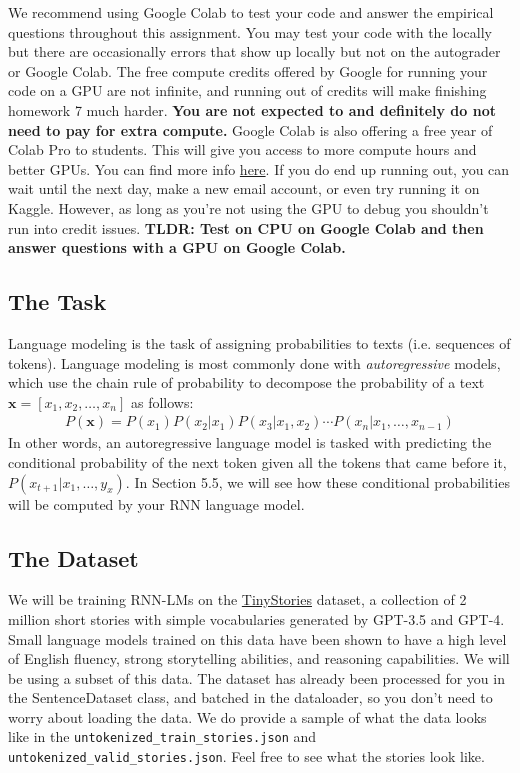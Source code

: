 \documentclass[11pt,addpoints,answers]{exam}
\newcommand{\xv}{\mathbf{x}}
\begin{document}
We recommend using Google Colab to test your code and answer the empirical questions throughout this assignment. You may test your code with the locally but there are occasionally errors that show up locally but not on the autograder or Google Colab. The free compute credits offered by Google for running your code on a GPU are not infinite, and running out of credits will make finishing homework 7 much harder. \textbf{You are not expected to and definitely do not need to pay for extra compute.} Google Colab is also offering a free year of Colab Pro to students. This will give you access to more compute hours and better GPUs. You can find more info \href{https://colab.research.google.com/signup}{here}. If you do end up running out, you can wait until the next day, make a new email account, or even try running it on Kaggle. However, as long as you're not using the GPU to debug you shouldn't run into credit issues. \textbf{TLDR: Test on CPU on Google Colab and then answer questions with a GPU on Google Colab.}

\subsection{The Task}\label{task}

Language modeling is the task of assigning probabilities to texts (i.e. sequences of tokens). Language modeling is most commonly done with \textit{autoregressive} models, which use the chain rule of probability to decompose the probability of a text $\xv = [ x_1, x_2, \ldots, x_n ]$ as follows:
\begin{align*}
    P(\xv) = P(x_1) P(x_2 | x_1) P(x_3 | x_1, x_2) \cdots P(x_n | x_1,\ldots,x_{n-1})
\end{align*}
In other words, an autoregressive language model is tasked with predicting the conditional probability of the next token given all the tokens that came before it, $P(x_{t+1} | x_1,\ldots,y_{x})$. In Section 5.5, we will see how these conditional probabilities will be computed by your RNN language model.


\subsection{The Dataset}\label{dataset}
We will be training RNN-LMs on the \href{https://huggingface.co/datasets/roneneldan/TinyStories}{TinyStories} dataset, a collection of 2 million short stories with simple vocabularies generated by GPT-3.5 and GPT-4. Small language models trained on this data have been shown to have a high level of English fluency, strong storytelling abilities, and reasoning capabilities. We will be using a subset of this data. The dataset has already been processed for you in the SentenceDataset class, and batched in the dataloader, so you don't need to worry about loading the data. We do provide a sample of what the data looks like in the \texttt{untokenized\_train\_stories.json} and \texttt{untokenized\_valid\_stories.json}. Feel free to see what the stories look like.
\end{document}
